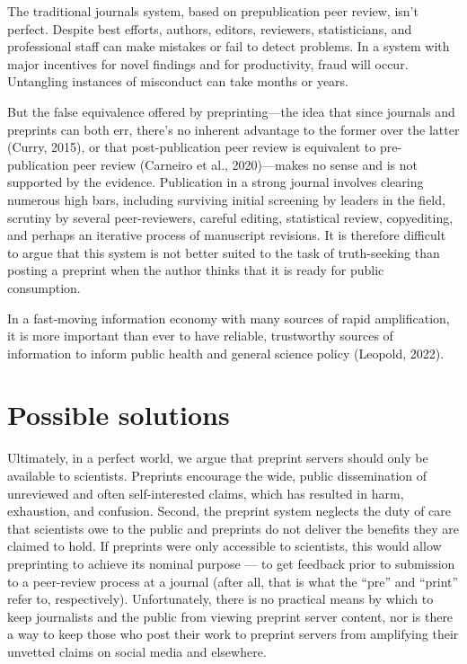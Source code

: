 \documentclass[authordate, empirical]{jote-new-article}
\begin{document}
	The traditional journals system, based on prepublication peer review, isn't perfect. Despite best efforts, authors, editors, reviewers, statisticians, and professional staff can make mistakes or fail to detect problems. In a system with major incentives for novel findings and for productivity, fraud will occur. Untangling instances of misconduct can take months or years.







	But the false equivalence offered by preprinting—the idea that since journals and preprints can both err, there's no inherent advantage to the former over the latter (Curry, 2015), or that post-publication peer review is equivalent to pre-publication peer review (Carneiro et al., 2020)—makes no sense and is not supported by the evidence. Publication in a strong journal involves clearing numerous high bars, including surviving initial screening by leaders in the field, scrutiny by several peer-reviewers, careful editing, statistical review, copyediting, and perhaps an iterative process of manuscript revisions. It is therefore difficult to argue that this system is not better suited to the task of truth-seeking than posting a preprint when the author thinks that it is ready for public consumption.







	In a fast-moving information economy with many sources of rapid amplification, it is more important than ever to have reliable, trustworthy sources of information to inform public health and general science policy (Leopold, 2022).







	\section{Possible solutions}







	Ultimately, in a perfect world, we argue that preprint servers should only be available to scientists. Preprints encourage the wide, public dissemination of unreviewed and often self-interested claims, which has resulted in harm, exhaustion, and confusion. Second, the preprint system neglects the duty of care that scientists owe to the public and preprints do not deliver the benefits they are claimed to hold. If preprints were only accessible to scientists, this would allow preprinting to achieve its nominal purpose — to get feedback prior to submission to a peer-review process at a journal (after all, that is what the “pre” and “print” refer to, respectively). Unfortunately, there is no practical means by which to keep journalists and the public from viewing preprint server content, nor is there a way to keep those who post their work to preprint servers from amplifying their unvetted claims on social media and elsewhere.
\end{document}
